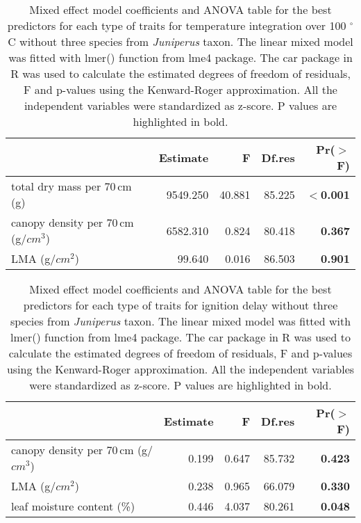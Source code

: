 \documentclass[12pt]{report}
\begin{document}
\begin{table}
\centering
\caption{Mixed effect model coefficients and ANOVA table for the best predictors for each type of traits for temperature integration over 100 $^{\circ}$C without three species from \emph{Juniperus} taxon. The linear mixed model was fitted with lmer() function from lme4 package. The car package in R  was used to calculate the estimated degrees of freedom of residuals, F and p-values using the Kenward-Roger approximation. All the independent variables were standardized  as z-score. P values are highlighted in bold.}
\vspace{0.5 cm}
\begin{tabular}{lrrrr}
  \hline
 &  Estimate & F  & Df.res & Pr($>$F) \\ 
  \hline 
  total dry mass per 70\,cm (g) & 9549.250 & 40.881  & 85.225 & \textbf{$<$0.001} \\ 
  canopy density per 70\,cm (g/{$cm^3$}) & 6582.310 & 0.824  & 80.418 & \textbf{0.367} \\ 
  LMA (g/{$cm^2$}) & 99.640 & 0.016 &  86.503 & \textbf{0.901} \\ 
   \hline
\end{tabular}
\end{table}



\begin{table}
\centering
\caption{Mixed effect model coefficients and ANOVA table for the best predictors for each type of traits for ignition delay without three species from \emph{Juniperus} taxon. The linear mixed model was fitted with lmer() function from lme4 package. The car package in R  was used to calculate the estimated degrees of freedom of residuals, F and p-values using the Kenward-Roger approximation. All the independent variables were standardized  as z-score. P values are highlighted in bold.}
\vspace{0.5 cm}
\begin{tabular}{lrrrr}
  \hline
 &  Estimate & F  & Df.res & Pr($>$F) \\ 
  \hline 
  canopy density per 70\,cm (g/{$cm^3$}) & 0.199 &  0.647 & 85.732 & \textbf{0.423} \\ 
  LMA (g/{$cm^2$}) & 0.238 & 0.965 & 66.079 & \textbf{0.330} \\ 
  leaf moisture content (\%) & 0.446 & 4.037 & 80.261  & \textbf{0.048} \\ 
   \hline
\end{tabular}
\end{table}
\end{document}
